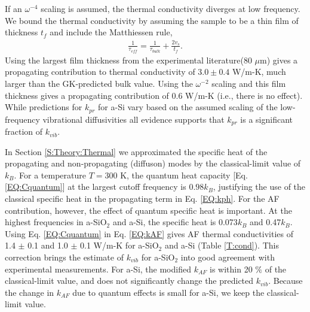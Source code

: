 \documentclass[aps,prb,onecolumn,preprint,superscriptaddress,footinbib,amsmath,amssymb,floatfix]{revtex4}
\begin{document}
If an $\omega^{-4}$ scaling is assumed, 
the thermal conductivity diverges at low frequency. We bound the 
thermal conductivity by assuming the sample to be a thin film 
of thickness $t_f$ and include the Matthiessen 
rule,\cite{sellan_cross-plane_2010} 
\begin{equation}\label{EQ:LambdaMatth}
\begin{split}
\frac{1}{\tau_{eff}} = \frac{1}{\tau_{bulk}} + 
\frac{2v_s}{t_f}.
\end{split}
\end{equation}
Using the largest film thickness from the experimental 
literature($80$ $\mu$m)\cite{liu_high_2009} 
gives a propagating contribution 
to thermal conductivity of $3.0 \pm 0.4$ W/m-K, much larger than the 
GK-predicted bulk value. 
Using the $\omega^{-2}$ scaling and this film thickness 
gives a propagating contribution of 0.6 W/m-K (i.e., there is 
no effect). 
While predictions for $k_{pr}$ for a-Si  
vary based on the assumed scaling of the low-frequency 
vibrational diffusivities
\cite{feldman_thermal_1993,cahill_thermal_1994,
feldman_numerical_1999,liu_high_2009,yang_anomalously_2010,
he_heat_2011} 
all evidence supports that $k_{pr}$ is a significant fraction 
of $k_{vib}$.
\cite{feldman_thermal_1993,cahill_thermal_1994,
feldman_numerical_1999,liu_high_2009,
yang_anomalously_2010,
he_heat_2011,regner_broadband_2013}

In Section \ref{S:Theory:Thermal} we approximated the specific heat 
of the propagating 
and non-propagating (diffuson) modes by the classical-limit 
value of $k_{B}$. For a temperature $T=300$ K, the quantum 
heat capacity [Eq. \eqref{EQ:Cquantum}] 
at the largest cutoff frequency is $0.98 k_{B}$, justifying the 
use of the classical specific heat in the propagating term 
in Eq. \eqref{EQ:kph}. For the AF contribution, however, the 
effect of quantum specific heat is important. At the highest 
frequencies in a-SiO$_2$ and a-Si, the specific heat is 
0.073$k_{B}$ and 0.47$k_{B}$. Using Eq. \eqref{EQ:Cquantum} 
in Eq. \eqref{EQ:kAF} gives AF thermal conductivities of 
1.4 $\pm$ 0.1 and 
1.0 $\pm$ 0.1 W/m-K for a-SiO$_2$ and a-Si (Table \ref{T:cond}). 
This correction brings the estimate of $k_{vib}$ for 
a-SiO$_2$ into good agreement with experimental measurements.
\cite{cahill_lattice_1988,lee_heat_1997,
yamane_measurement_2002,regner_broadband_2013} 
For a-Si, the modified $k_{AF}$ is within 20 $\%$ of the 
classical-limit value, 
and does not significantly change the predicted $k_{vib}$. 
Because the change in $k_{AF}$ due to quantum effects is 
small for a-Si, 
we keep the classical-limit value.  
\end{document}
